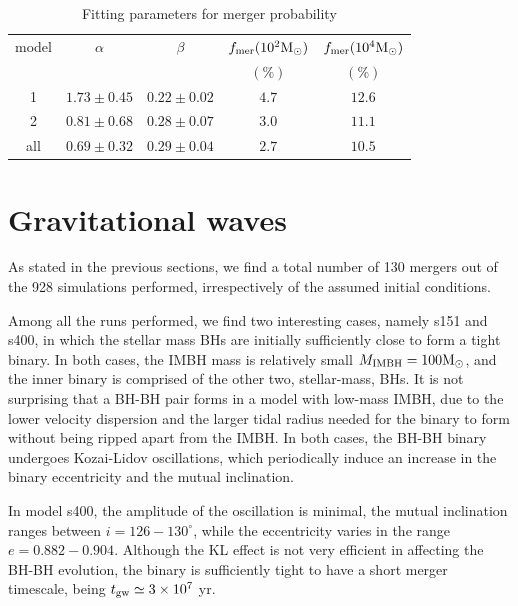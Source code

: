 \documentclass[twocolumn]{aastex62}
\newcommand{\Ms}{{\rm M}_\odot}
\newcommand{\ibh}{{\rm IMBH}}
\begin{document}
\begin{table}
\caption{Fitting parameters for merger probability}
\begin{center}
\begin{tabular}{ccccc}
\hline
\hline
model & $\alpha$ & $\beta$ & $f_{\rm mer}(10^2\Ms)$ & $f_{\rm mer}(10^4\Ms)$  \\
      & & & $(\%)$ & $(\%)$ \\
\hline
1   & $1.73\pm 0.45$& $0.22\pm 0.02$& $4.7$& $12.6$\\
2   & $0.81\pm 0.68$& $0.28\pm 0.07$& $3.0$& $11.1$\\
all & $0.69\pm 0.32$& $0.29\pm 0.04$& $2.7$& $10.5$\\
\hline
\end{tabular}
\end{center}
\label{t2}
\end{table}





\section{Gravitational waves}

As stated in the previous sections, we find a total number of 130 mergers out of the 928 simulations performed, irrespectively of the assumed initial conditions. 


Among all the runs performed, we find two interesting cases, namely s151 and s400, in which the stellar mass BHs are initially sufficiently close to form a tight binary. In both cases, the IMBH mass is relatively small $M_{\ibh} = 100\Ms$, and the inner binary is comprised of the other two, stellar-mass, BHs. It is not surprising that a BH-BH pair forms in a model with low-mass IMBH, due to the lower velocity dispersion and the larger tidal radius needed for the binary to form without being ripped apart from the IMBH. In both cases, the BH-BH binary undergoes Kozai-Lidov oscillations, which periodically induce an increase in the binary eccentricity and the mutual inclination.

In model s400, the amplitude of the oscillation is minimal, the mutual inclination ranges between $i = 126-130^\circ$, while the eccentricity varies in the range $e = 0.882-0.904$. Although the KL effect is not very efficient in affecting the BH-BH evolution, the binary is sufficiently tight to have a short merger timescale, being $t_{\rm gw} \simeq 3\times 10^7$ yr.
\end{document}
